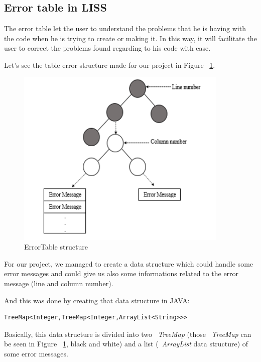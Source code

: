 \documentclass[
  oneside,
  11pt, a4paper,
  footinclude=true,
  headinclude=true,
  cleardoublepage=empty
]{scrbook}
\begin{document}
\subsection{Error table in LISS}

The error table let the user to understand the problems that he is having with the code when he is trying to create or making it.
In this way, it will facilitate the user to correct the problems found regarding to his code with ease.

Let's see the table error structure made for our project in Figure ~\ref{fig:error_table_structure}.

\begin{figure}[h!]
  \centering
    \includegraphics[width=0.9\textwidth]{img/error_table_liss.png}
    \caption{ErrorTable structure}
    \label{fig:error_table_structure}
\end{figure}

For our project, we managed to create a data structure which could handle some error messages and could give us also some informations related to the error message (line and column number).

And this was done by creating that data structure in JAVA:

\begin{lstlisting}[caption={Data structure of the error table in LISS},label={lst:error_table_liss_java_implementation}]
	TreeMap<Integer,TreeMap<Integer,ArrayList<String>>>
\end{lstlisting}

Basically, this data structure is divided into two ~\textit{TreeMap} (those ~\textit{TreeMap} can be seen in Figure ~\ref{fig:error_table_structure}, black and white) and a list (~\textit{ArrayList} data structure) of some error messages.
\end{document}

